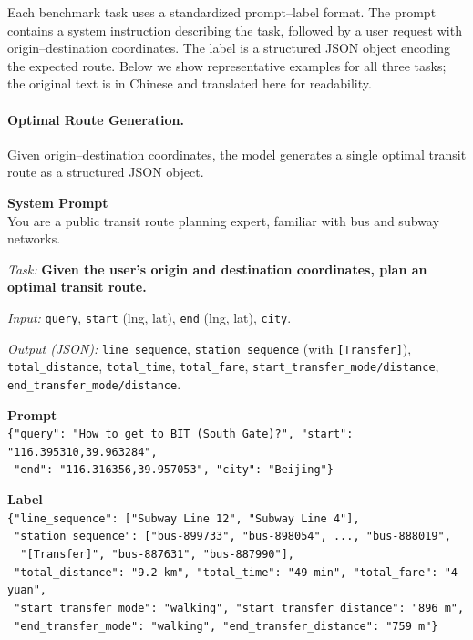 \documentclass{llmxive}
\begin{document}
Each benchmark task uses a standardized prompt--label format. The prompt contains a system instruction describing the task, followed by a user request with origin--destination coordinates. The label is a structured JSON object encoding the expected route. Below we show representative examples for all three tasks; the original text is in Chinese and translated here for readability.

\paragraph{Optimal Route Generation.}
Given origin--destination coordinates, the model generates a single optimal transit route as a structured JSON object.
\begin{tcolorbox}[colback=gray!3, colframe=black!40, boxrule=0.4pt, arc=2pt, left=6pt, right=6pt, top=4pt, bottom=4pt, fontupper=\small, fontlower=\small, breakable, title={\small\textbf{Prompt \& Label}}]
\textbf{System Prompt} \\[2pt]
You are a public transit route planning expert, familiar with bus and subway networks.

\textit{Task:} \textbf{Given the user's origin and destination coordinates, plan an optimal transit route.}

\textit{Input:} \texttt{query}, \texttt{start} (lng, lat), \texttt{end} (lng, lat), \texttt{city}.

\textit{Output (JSON):} \texttt{line\_sequence}, \texttt{station\_sequence} (with \texttt{[Transfer]}), \texttt{total\_distance}, \texttt{total\_time}, \texttt{total\_fare}, \texttt{start\_transfer\_mode/distance}, \texttt{end\_transfer\_mode/distance}.

\tcblower

\textbf{Prompt} \\[2pt]
\texttt{\{"query": "How to get to BIT (South Gate)?", "start": "116.395310,39.963284",} \\
\texttt{~"end": "116.316356,39.957053", "city": "Beijing"\}}

\vspace{6pt}
\textbf{Label} \\[2pt]
\texttt{\{"line\_sequence": ["Subway Line 12", "Subway Line 4"],} \\
\texttt{~"station\_sequence": ["bus-899733", "bus-898054", ..., "bus-888019",} \\
\texttt{~~"[Transfer]", "bus-887631", "bus-887990"],} \\
\texttt{~"total\_distance": "9.2 km", "total\_time": "49 min", "total\_fare": "4 yuan",} \\
\texttt{~"start\_transfer\_mode": "walking", "start\_transfer\_distance": "896 m",} \\
\texttt{~"end\_transfer\_mode": "walking", "end\_transfer\_distance": "759 m"\}}
\end{tcolorbox}
\end{document}
